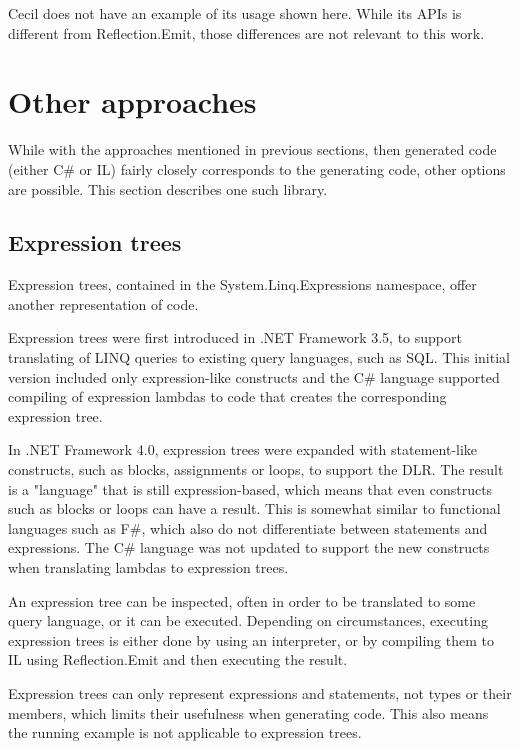 \medskip

Cecil does not have an example of its usage shown here. While its \acp{API} is different from Reflection.Emit, those differences are not relevant to this work.

\section{Other approaches}

While with the approaches mentioned in previous sections, then generated code (either C\# or \ac{IL}) fairly closely corresponds to the generating code, other options are possible. This section describes one such library.

\subsection{Expression trees}
\label{expression-trees}

Expression trees, \cite{expression-trees} contained in the System.Linq.Expressions namespace, offer another representation of code.

Expression trees were first introduced in .NET Framework 3.5, to support translating of \ac{LINQ} queries to existing query languages, such as \ac{SQL}. This initial version included only expression-like constructs and the C\# language supported compiling of expression lambdas to code that creates the corresponding expression tree.

In .NET Framework 4.0, expression trees were expanded with statement-like constructs, such as blocks, assignments or loops, to support the \ac{DLR}. The result is a "language" that is still expression-based, which means that even constructs such as blocks or loops can have a result. This is somewhat similar to functional languages such as F\#, which also do not differentiate between statements and expressions. The C\# language was not updated to support the new constructs when translating lambdas to expression trees.

An expression tree can be inspected, often in order to be translated to some query language, or it can be executed. Depending on circumstances, executing expression trees is either done by using an interpreter, or by compiling them to \ac{IL} using Reflection.Emit and then executing the result.

Expression trees can only represent expressions and statements, not types or their members, which limits their usefulness when generating code. This also means the running example is not applicable to expression trees.


